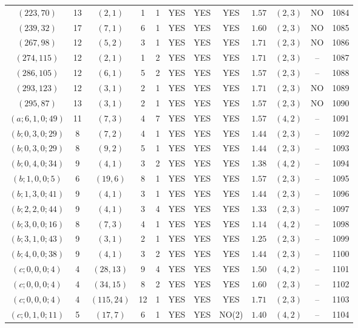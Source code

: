 \begin{longtable}{|c|c|c|c|c|c|c|c|c|c|c|c|}
$(223,70)$ & 13 & $(2,1)$ & 1 & 1 & YES & YES & YES & $1.57$ & $(2,3)$ & NO & 1084\\
$(239,32)$ & 17 & $(7,1)$ & 6 & 1 & YES & YES & YES & $1.60$ & $(2,3)$ & NO & 1085\\
$(267,98)$ & 12 & $(5,2)$ & 3 & 1 & YES & YES & YES & $1.71$ & $(2,3)$ & NO & 1086\\
$(274,115)$ & 12 & $(2,1)$ & 1 & 2 & YES & YES & YES & $1.71$ & $(2,3)$ & -- & 1087\\
$(286,105)$ & 12 & $(6,1)$ & 5 & 2 & YES & YES & YES & $1.57$ & $(2,3)$ & -- & 1088\\
$(293,123)$ & 12 & $(3,1)$ & 2 & 1 & YES & YES & YES & $1.71$ & $(2,3)$ & NO & 1089\\
$(295,87)$ & 13 & $(3,1)$ & 2 & 1 & YES & YES & YES & $1.57$ & $(2,3)$ & NO & 1090\\
$(a;6,1,0;49)$ & 11 & $(7,3)$ & 4 & 7 & YES & YES & YES & $1.57$ & $(4,2)$ & -- & 1091\\
$(b;0,3,0;29)$ & 8 & $(7,2)$ & 4 & 1 & YES & YES & YES & $1.44$ & $(2,3)$ & -- & 1092\\
$(b;0,3,0;29)$ & 8 & $(9,2)$ & 5 & 1 & YES & YES & YES & $1.44$ & $(2,3)$ & -- & 1093\\
$(b;0,4,0;34)$ & 9 & $(4,1)$ & 3 & 2 & YES & YES & YES & $1.38$ & $(4,2)$ & -- & 1094\\
$(b;1,0,0;5)$ & 6 & $(19,6)$ & 8 & 1 & YES & YES & YES & $1.57$ & $(2,3)$ & -- & 1095\\
$(b;1,3,0;41)$ & 9 & $(4,1)$ & 3 & 1 & YES & YES & YES & $1.44$ & $(2,3)$ & -- & 1096\\
$(b;2,2,0;44)$ & 9 & $(4,1)$ & 3 & 4 & YES & YES & YES & $1.33$ & $(2,3)$ & -- & 1097\\
$(b;3,0,0;16)$ & 8 & $(7,3)$ & 4 & 1 & YES & YES & YES & $1.14$ & $(4,2)$ & -- & 1098\\
$(b;3,1,0;43)$ & 9 & $(3,1)$ & 2 & 1 & YES & YES & YES & $1.25$ & $(2,3)$ & -- & 1099\\
$(b;4,0,0;38)$ & 9 & $(4,1)$ & 3 & 2 & YES & YES & YES & $1.44$ & $(2,3)$ & -- & 1100\\
$(c;0,0,0;4)$ & 4 & $(28,13)$ & 9 & 4 & YES & YES & YES & $1.50$ & $(4,2)$ & -- & 1101\\
$(c;0,0,0;4)$ & 4 & $(34,15)$ & 8 & 2 & YES & YES & YES & $1.60$ & $(2,3)$ & -- & 1102\\
$(c;0,0,0;4)$ & 4 & $(115,24)$ & 12 & 1 & YES & YES & YES & $1.71$ & $(2,3)$ & -- & 1103\\
$(c;0,1,0;11)$ & 5 & $(17,7)$ & 6 & 1 & YES & YES & NO(2) & $1.40$ & $(4,2)$ & -- & 1104\\

\end{longtable}
